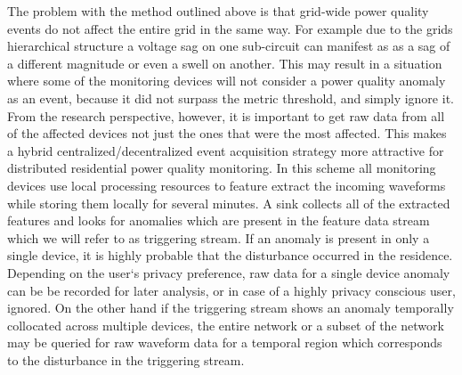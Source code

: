 The problem with the method outlined above is that grid-wide power quality events do not affect the entire grid in the same way. For example due to the grids hierarchical structure a voltage sag on one sub-circuit can manifest as as a sag of a different magnitude or even a swell on another.\cite{kahle2016power} This may result in a situation where some of the monitoring devices will not consider a power quality anomaly as an event, because it did not surpass the metric threshold, and simply ignore it. From the research perspective, however, it is important to get raw data from all of the affected devices not just the ones that were the most affected. This makes a hybrid centralized/decentralized event acquisition strategy more attractive for distributed residential power quality monitoring. In this scheme all monitoring devices use local processing resources to feature extract the incoming waveforms while storing them locally for several minutes. A sink collects all of the extracted features and looks for anomalies which are present in the feature data stream which we will refer to as triggering stream. If an anomaly is present in only a single device, it is highly probable that the disturbance occurred in the residence. Depending on the user`s privacy preference, raw data for a single device anomaly can be be recorded for later analysis, or in case of a highly privacy conscious user, ignored. On the other hand if the triggering stream shows an anomaly temporally collocated across multiple devices, the entire network or a subset of the network may be queried for raw waveform data for a temporal region which corresponds to the disturbance in the triggering stream.

